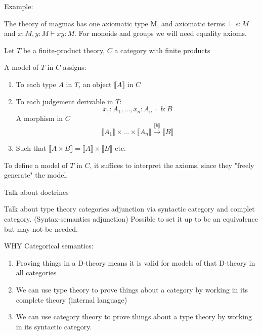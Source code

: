 Example:

The theory of magmas has one axiomatic type M, and axiomatic terms $\vdash e : M$ and $x : M, y : M \vdash xy : M$. For monoids and groups we will need equality axioms.

Let $T$ be a finite-product theory, $C$ a category with finite products

A model of $T$ in $C$ assigns:

\begin{enumerate}
\item To each type $A$ in $T$, an object $\llbracket A \rrbracket$ in $C$
\item To each judgement derivable in $T$:
    $$x_1 : A_1, \dots, x_n : A_n \vdash b : B$$
    A morphism in $C$
    $$\llbracket A_1 \rrbracket \times \dots \times \llbracket A_n \rrbracket \xrightarrow{\llbracket b \rrbracket} \llbracket B \rrbracket$$
\item Such that $\llbracket A \times B \rrbracket = \llbracket A \rrbracket \times \llbracket B \rrbracket$ etc.
\end{enumerate}

To define a model of $T$ in $C$, it suffices to interpret the axioms, since they "freely generate" the model.


Talk about doctrines

Talk about type theory categories adjunction via syntactic category and complet category. (Syntax-semantics adjunction) Possible to set it up to be an equivalence but may not be needed.

WHY Categorical semantics:
\begin{enumerate}
 \item Proving things in a D-theory means it is valid for models of that D-theory in all categories
 \item We can use type theory to prove things about a category by working in its complete theory (internal language)
 \item We can use category theory to prove things about a type theory by working in its syntactic category.
\end{enumerate}






